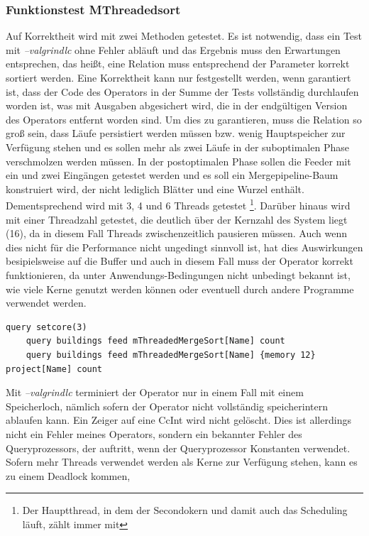 \documentclass[a4paper,12pt,twoside]{article}
\newcommand{\Fb}[1]{\textit{#1}} %
\begin{document}
\subsubsection{Funktionstest MThreadedsort}

Auf Korrektheit wird mit zwei Methoden getestet. Es ist notwendig, dass ein Test mit \Fb{--valgrindlc} ohne Fehler abläuft und das Ergebnis muss den Erwartungen entsprechen, das heißt, eine Relation muss entsprechend der Parameter korrekt sortiert werden. Eine Korrektheit kann nur festgestellt werden, wenn garantiert ist, dass der Code des Operators in der Summe der Tests vollständig durchlaufen worden ist, was mit Ausgaben abgesichert wird, die in der endgültigen Version des Operators entfernt worden sind. Um dies zu garantieren, muss die Relation so groß sein, dass Läufe persistiert werden müssen bzw. wenig Hauptspeicher zur Verfügung stehen und es sollen mehr als zwei Läufe in der suboptimalen Phase verschmolzen werden müssen. In der postoptimalen Phase sollen die Feeder mit ein und zwei Eingängen getestet werden und es soll ein Mergepipeline-Baum konstruiert wird, der nicht lediglich Blätter und eine Wurzel enthält. Dementsprechend wird mit 3, 4 und 6 Threads getestet \footnote{Der Hauptthread, in dem der Secondokern und damit auch das Scheduling läuft, zählt immer mit}. Darüber hinaus wird mit einer Threadzahl getestet, die deutlich über der Kernzahl des System liegt (16), da in diesem Fall Threads zwischenzeitlich pausieren müssen. Auch wenn dies nicht für die Performance nicht ungedingt sinnvoll ist, hat dies Auswirkungen besipielsweise auf die Buffer und auch in diesem Fall muss der Operator korrekt funktionieren, da unter Anwendungs-Bedingungen nicht unbedingt bekannt ist, wie viele Kerne genutzt werden können oder eventuell durch andere Programme verwendet werden.

\begin{minipage}{\linewidth}
	\begin{lstlisting}[caption={Beispiel Testqueries für den Sort-Operator}, label=list:testsort]
	query setcore(3)
	query buildings feed mThreadedMergeSort[Name] count
	query buildings feed mThreadedMergeSort[Name] {memory 12} project[Name] count
	\end{lstlisting}
\end{minipage}

Mit \Fb{--valgrindlc} terminiert der Operator nur in einem Fall mit einem Speicherloch, nämlich sofern der Operator nicht vollständig speicherintern ablaufen kann. Ein Zeiger auf eine CcInt wird nicht gelöscht. Dies ist allerdings nicht ein Fehler meines Operators, sondern ein bekannter Fehler des Queryprozessors, der auftritt, wenn der Queryprozessor Konstanten verwendet. Sofern mehr Threads verwendet werden als Kerne zur Verfügung stehen, kann es zu einem Deadlock kommen, 
\end{document}
